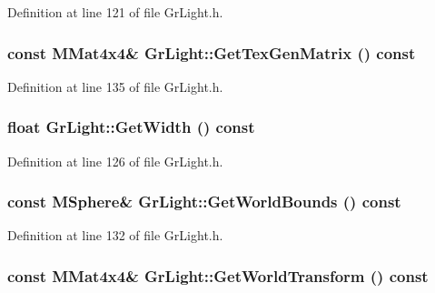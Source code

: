 Definition at line 121 of file GrLight.h.\hypertarget{class_gr_light_a440dfedc25621828db76fa3942867f6}{
\subsubsection[{GetTexGenMatrix}]{\setlength{\rightskip}{0pt plus 5cm}const {\bf MMat4x4}\& GrLight::GetTexGenMatrix () const}}
\label{class_gr_light_a440dfedc25621828db76fa3942867f6}




Definition at line 135 of file GrLight.h.\hypertarget{class_gr_light_e8f2c2a5e6500cda537befefa64d0596}{
\subsubsection[{GetWidth}]{\setlength{\rightskip}{0pt plus 5cm}float GrLight::GetWidth () const}}
\label{class_gr_light_e8f2c2a5e6500cda537befefa64d0596}




Definition at line 126 of file GrLight.h.\hypertarget{class_gr_light_e340863c34ce1b15451dff25796a5eee}{
\subsubsection[{GetWorldBounds}]{\setlength{\rightskip}{0pt plus 5cm}const {\bf MSphere}\& GrLight::GetWorldBounds () const}}
\label{class_gr_light_e340863c34ce1b15451dff25796a5eee}




Definition at line 132 of file GrLight.h.\hypertarget{class_gr_light_6ef30451289f25c79d3b297ac0f773a8}{
\subsubsection[{GetWorldTransform}]{\setlength{\rightskip}{0pt plus 5cm}const {\bf MMat4x4}\& GrLight::GetWorldTransform () const}}
\label{class_gr_light_6ef30451289f25c79d3b297ac0f773a8}




